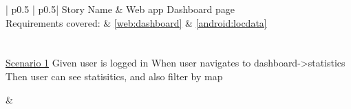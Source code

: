 \begin{longtable}{| p{} | p{}|}
	\hline
	\newline Story Name & \newline Web app Dashboard page\\\hline
	\newline Requirements covered: & \newline \ref{web:dashboard} \& \ref{android:locdata}\\\hline
	\\\hline
	\\\hline
	\newline\underline{Scenario 1}\newline
	Given user is logged in\newline
	When user navigates to dashboard->statistics \newline 
	Then user can see statisitics, and also filter by map\newline
	
	&
	\\\hline
\end{longtable}

